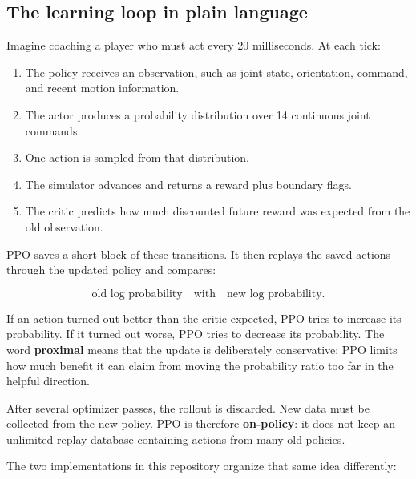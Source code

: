 \documentclass[
  american,
  11pt,
  letterpaper,
]{article}
\providecommand{\tightlist}{%
  \setlength{\itemsep}{0pt}\setlength{\parskip}{0pt}}
\begin{document}
\subsection{The learning loop in plain
language}\label{the-learning-loop-in-plain-language}

Imagine coaching a player who must act every 20 milliseconds. At each
tick:

\begin{enumerate}
\def\labelenumi{\arabic{enumi}.}
\tightlist
\item
  The policy receives an observation, such as joint state, orientation,
  command, and recent motion information.
\item
  The actor produces a probability distribution over 14 continuous joint
  commands.
\item
  One action is sampled from that distribution.
\item
  The simulator advances and returns a reward plus boundary flags.
\item
  The critic predicts how much discounted future reward was expected
  from the old observation.
\end{enumerate}

PPO saves a short block of these transitions. It then replays the saved
actions through the updated policy and compares:

\[
\text{old log probability}
\quad\text{with}\quad
\text{new log probability}.
\]

If an action turned out better than the critic expected, PPO tries to
increase its probability. If it turned out worse, PPO tries to decrease
its probability. The word \textbf{proximal} means that the update is
deliberately conservative: PPO limits how much benefit it can claim from
moving the probability ratio too far in the helpful direction.

After several optimizer passes, the rollout is discarded. New data must
be collected from the new policy. PPO is therefore \textbf{on-policy}:
it does not keep an unlimited replay database containing actions from
many old policies.

The two implementations in this repository organize that same idea
differently:
\end{document}

